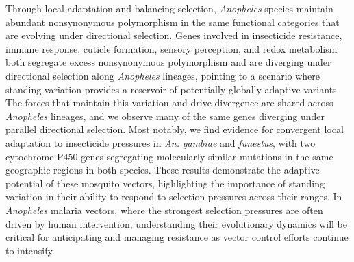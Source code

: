 Through local adaptation and balancing selection,
\textit{Anopheles} species maintain abundant nonsynonymous
polymorphism in the same functional categories that are evolving under directional selection.
Genes involved in insecticide resistance, immune response, cuticle formation, sensory perception, and redox metabolism
both segregate excess nonsynonymous polymorphism and are diverging under directional selection along \textit{Anopheles} lineages,
pointing to a scenario where standing variation provides a reservoir of potentially globally-adaptive variants.
The forces that maintain this variation and drive divergence are shared across \textit{Anopheles} lineages,
and we observe many of the same genes diverging under parallel directional selection.
Most notably, we find evidence for convergent local adaptation to insecticide pressures in \textit{An. gambiae} and \textit{funestus},
with two cytochrome P450 genes segregating molecularly similar mutations in the same geographic regions in both species.
These results demonstrate the adaptive potential of these mosquito vectors, highlighting the importance of standing
variation in their ability to respond to selection pressures across their ranges.
In \textit{Anopheles} malaria vectors, where the strongest selection pressures are often driven by human intervention,
understanding their evolutionary dynamics will be critical for anticipating and managing resistance
as vector control efforts continue to intensify.




